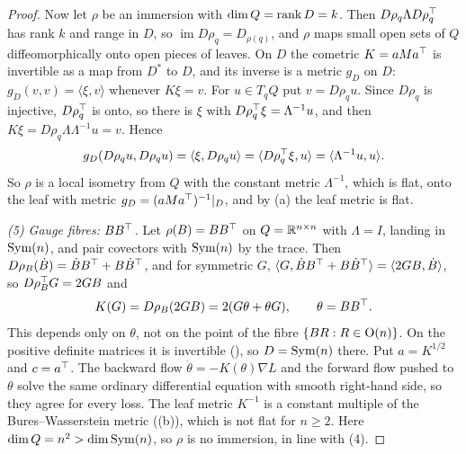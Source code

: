 \begin{proof}
Now let $\rho$ be an immersion with $\dim Q=\operatorname{rank} D=k$. Then $D\rho_q\Lambda D\rho_q^{\top}$ has rank $k$ and range in $D$, so
$\operatorname{im}D\rho_q=D_{\rho(q)}$, and $\rho$ maps small open sets of $Q$ diffeomorphically onto open pieces of leaves.
On $D$ the cometric $K=aMa^{\top}$ is invertible as a map from $D^*$ to $D$, and its inverse is a metric $g_D$ on $D$:
$g_D(v,v)=\langle\xi,v\rangle$ whenever $K\xi=v$. For $u\in T_qQ$ put $v=D\rho_qu$. Since $D\rho_q$ is injective,
$D\rho_q^{\top}$ is onto, so there is $\xi$ with $D\rho_q^{\top}\xi=\Lambda^{-1}u$, and then $K\xi=D\rho_q\Lambda\Lambda^{-1}u=v$. Hence
\[g_D(D\rho_qu,D\rho_qu)=\langle\xi,D\rho_qu\rangle=\langle D\rho_q^{\top}\xi,u\rangle=\langle\Lambda^{-1}u,u\rangle .\]
So $\rho$ is a local isometry from $Q$ with the constant metric $\Lambda^{-1}$, which is flat, onto the leaf with metric
$g_D=(aMa^{\top})^{-1}|_D$, and by (a) the leaf metric is flat.

\emph{(5) Gauge fibres: $BB^{\top}$.} Let $\rho(B)=BB^{\top}$ on $Q=\mathbb{R}^{n\times n}$ with $\Lambda=I$, landing in $\mathrm{Sym}(n)$, and pair
covectors with $\mathrm{Sym}(n)$ by the trace. Then $D\rho_B(\dot B)=\dot BB^{\top}+B\dot B^{\top}$, and for symmetric $G$,
$\langle G,\dot BB^{\top}+B\dot B^{\top}\rangle=\langle2GB,\dot B\rangle$, so $D\rho_B^{\top} G=2GB$ and
\[K(G)=D\rho_B(2GB)=2(G\theta+\theta G),\qquad\theta=BB^{\top} .\]
This depends only on $\theta$, not on the point of the fibre $\{BR:R\in\mathrm{O}(n)\}$. On the positive definite matrices it is
invertible (), so $D=\mathrm{Sym}(n)$ there. Put $a=K^{1/2}$ and $c=a^{\top}$. The backward flow
$\dot\theta=-K(\theta)\nabla L$ and the forward flow pushed to $\theta$ solve the same ordinary differential equation with
smooth right-hand side, so they agree for every loss. The leaf metric $K^{-1}$ is a constant multiple of the
Bures--Wasserstein metric ((b)), which is not flat for $n\ge2$. Here $\dim Q=n^2>\dim\mathrm{Sym}(n)$, so $\rho$ is no
immersion, in line with (4).


\end{proof}

